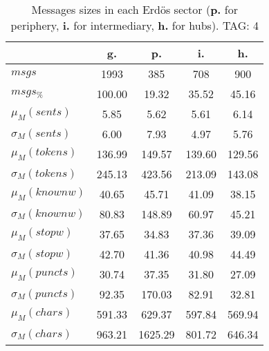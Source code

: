 \begin{table}[h!]
\begin{center}
\begin{tabular}{| l || c | c | c | c |}\hline
 & {\bf g.} & {\bf p.} & {\bf i.} & {\bf h.} \\\hline\hline
$msgs$ & 1993  & 385  & 708  & 900 \\
$msgs_{\%}$ & 100.00  & 19.32  & 35.52  & 45.16 \\\hline
$\mu_M(sents)$ & 5.85  & 5.62  & 5.61  & 6.14 \\
$\sigma_M(sents)$ & 6.00  & 7.93  & 4.97  & 5.76 \\\hline
$\mu_M(tokens)$ & 136.99  & 149.57  & 139.60  & 129.56 \\
$\sigma_M(tokens)$ & 245.13  & 423.56  & 213.09  & 143.08 \\\hline
$\mu_M(knownw)$ & 40.65  & 45.71  & 41.09  & 38.15 \\
$\sigma_M(knownw)$ & 80.83  & 148.89  & 60.97  & 45.21 \\\hline
$\mu_M(stopw)$ & 37.65  & 34.83  & 37.36  & 39.09 \\
$\sigma_M(stopw)$ & 42.70  & 41.36  & 40.98  & 44.49 \\\hline
$\mu_M(puncts)$ & 30.74  & 37.35  & 31.80  & 27.09 \\
$\sigma_M(puncts)$ & 92.35  & 170.03  & 82.91  & 32.81 \\\hline
$\mu_M(chars)$ & 591.33  & 629.37  & 597.84  & 569.94 \\
$\sigma_M(chars)$ & 963.21  & 1625.29  & 801.72  & 646.34 \\\hline
\end{tabular}
\caption{Messages sizes in each Erd\"os sector ({{\bf p.}} for periphery, {{\bf i.}} for intermediary, {{\bf h.}} for hubs). TAG: 4}
\end{center}
\end{table}